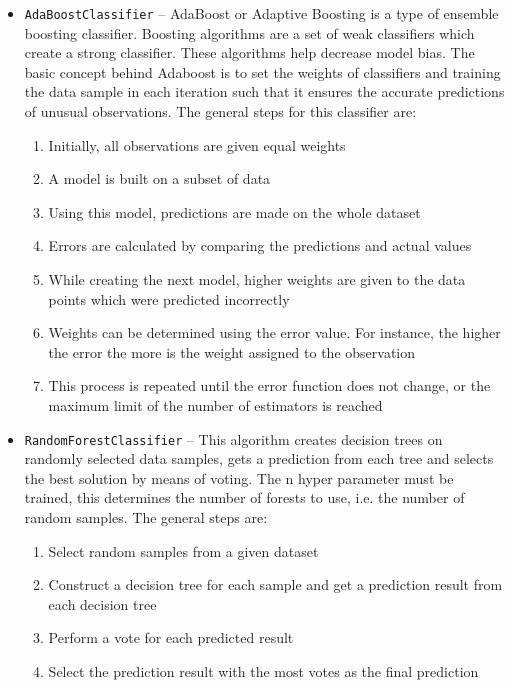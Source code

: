 \begin{itemize}
    \item \texttt{AdaBoostClassifier} -- AdaBoost or Adaptive Boosting is a type of ensemble boosting classifier. Boosting algorithms are a set of weak classifiers which create a strong classifier. These algorithms help decrease model bias. The basic concept behind Adaboost is to set the weights of classifiers and training the data sample in each iteration such that it ensures the accurate predictions of unusual observations. The general steps for this classifier are:
    \begin{enumerate}
        \item Initially, all observations are given equal weights
        \item A model is built on a subset of data
        \item Using this model, predictions are made on the whole dataset
        \item Errors are calculated by comparing the predictions and actual values
        \item While creating the next model, higher weights are given to the data points which were predicted incorrectly
        \item Weights can be determined using the error value. For instance, the higher the error the more is the weight assigned to the observation
        \item This process is repeated until the error function does not change, or the maximum limit of the number of estimators is reached
    \end{enumerate}
    \item \texttt{RandomForestClassifier} -- This algorithm creates decision trees on randomly selected data samples, gets a prediction from each tree and selects the best solution by means of voting. The n hyper parameter must be trained, this determines the number of forests to use, i.e. the number of random samples. The general steps are:
    \begin{enumerate}
        \item Select random samples from a given dataset
        \item Construct a decision tree for each sample and get a prediction result from each decision tree
        \item Perform a vote for each predicted result
        \item Select the prediction result with the most votes as the final prediction
    \end{enumerate}
    \begin{figure}[h]

\end{figure}
\end{itemize}
